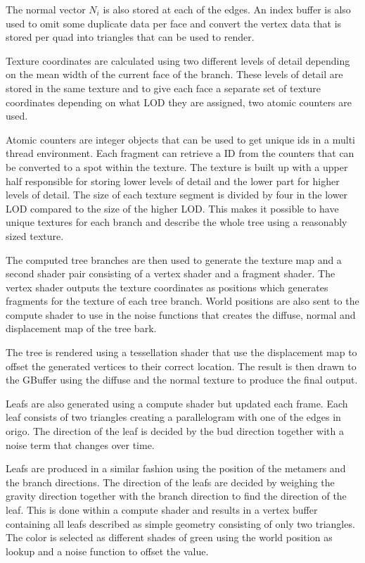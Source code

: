 \documentclass[11pt]{article} %
\begin{document}
The normal vector $ N_{i} $ is also stored at each of the edges.
An index buffer is also used to omit some duplicate data per face and convert the vertex data that is stored per quad into triangles that can be used to render.

Texture coordinates are calculated using two different levels of detail depending on the mean width of the current face of the branch.
These levels of detail are stored in the same texture and to give each face a separate set of texture coordinates depending on what LOD they are assigned, two atomic counters are used.

Atomic counters are integer objects that can be used to get unique ids in a multi thread environment.
Each fragment can retrieve a ID from the counters that can be converted to a spot within the texture.
The texture is built up with a upper half responsible for storing lower levels of detail and the lower part for higher levels of detail.
The size of each texture segment is divided by four in the lower LOD compared to the size of the higher LOD.
This makes it possible to have unique textures for each branch and describe the whole tree using a reasonably sized texture.

The computed tree branches are then used to generate the texture map and a second shader pair consisting of a vertex shader and a fragment shader.
The vertex shader outputs the texture coordinates as positions which generates fragments for the texture of each tree branch.
World positions are also sent to the compute shader to use in the noise functions that creates the diffuse, normal and displacement map of the tree bark.

The tree is rendered using a tessellation shader that use the displacement map to offset the generated vertices to their correct location.
The result is then drawn to the GBuffer using the diffuse and the normal texture to produce the final output.

Leafs are also generated using a compute shader but updated each frame.
Each leaf consists of two triangles creating a parallelogram with one of the edges in origo.
The direction of the leaf is decided by the bud direction together with a noise term that changes over time.

Leafs are produced in a similar fashion using the position of the metamers and the branch directions.
The direction of the leafs are decided by weighing the gravity direction together with the branch direction to find the direction of the leaf.
This is done within a compute shader and results in a vertex buffer containing all leafs described as simple geometry consisting of only two triangles.
The color is selected as different shades of green using the world position as lookup and a noise function to offset the value.
\end{document}
